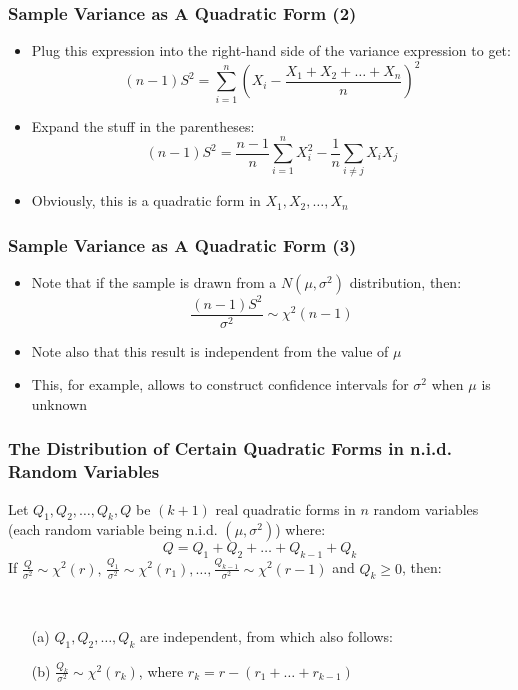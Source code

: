\documentclass[10pt]{beamer}
\theoremstyle{definition}
\begin{document}
\begin{frame}[fragile]
\frametitle{Sample Variance as A Quadratic Form (2)}
\begin{itemize}
	\item Plug this expression into the right-hand side of the variance expression to get:
	\[
		(n-1)S^{2} = \sum_{i=1}^{n}\left(X_{i} - \frac{X_{1} + X_{2} + \ldots + X_{n}}{n}\right)^{2}
	\]
	\item Expand the stuff in the parentheses:
	\[
		(n-1)S^{2} = \frac{n-1}{n}\sum_{i=1}^{n}X_{i}^{2} - \frac{1}{n}\sum_{i\neq j}X_{i}X_{j}
	\]
	\item Obviously, this is a quadratic form in $X_{1}, X_{2}, \ldots, X_{n}$
	
\end{itemize}
\end{frame}

\begin{frame}[fragile]
\frametitle{Sample Variance as A Quadratic Form (3)}
\begin{itemize}
	\item Note that if the sample is drawn from a $N(\mu, \sigma^{2})$ distribution, then:
	\[
		\frac{(n-1)S^{2}}{\sigma^{2}} \sim \chi^{2}(n-1)
	\]
	\item Note also that this result is independent from the value of $\mu$
	\item This, for example, allows to construct confidence intervals for $\sigma^{2}$ when $\mu$ is unknown
\end{itemize}
\end{frame}

\begin{frame}[fragile]
\frametitle{The Distribution of Certain Quadratic Forms in n.i.d. Random Variables}

\begin{theorem}
	Let $Q_{1}, Q_{2}, \ldots, Q_{k}, Q$ be $(k+1)$ real quadratic forms in $n$ random variables (each random variable being n.i.d. $(\mu,\sigma^{2})$) where:
	\[
		Q = Q_{1} + Q_{2} + \ldots + Q_{k-1} + Q_{k}
	\]
	If $\displaystyle \frac{Q}{\sigma^{2}}\sim \chi^{2}(r),\,\frac{Q_{1}}{\sigma^{2}}\sim \chi^{2}(r_{1}),\ldots, \frac{Q_{k-1}}{\sigma^{2}}\sim \chi^{2}(r-1)$ and $Q_{k} \geq 0$, then:
	
	\quad\\
	\begin{itemize}
		\item[(a)] $Q_{1}, Q_{2}, \ldots, Q_{k}$ are independent, from which also follows:
		\item[(b)] $\displaystyle \frac{Q_{k}}{\sigma^{2}}\sim \chi^{2}(r_{k})$, where $r_{k} = r - (r_{1} + \ldots + r_{k-1})$
	\end{itemize}
\end{theorem}
\end{frame}
\end{document}
